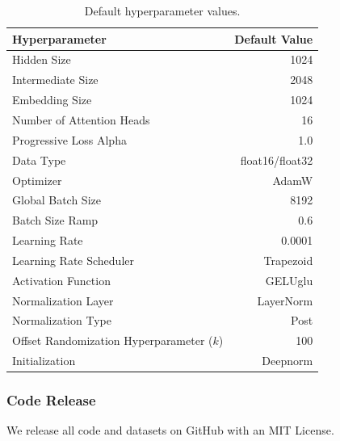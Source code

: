 \documentclass{article}
\begin{document}
\begin{table}
    \centering
    \caption{Default hyperparameter values.}
    \begin{tabular}{lr} 
    \toprule
         Hyperparameter & Default Value\\
         \midrule
         Hidden Size& 1024\\ 
         Intermediate Size& 2048\\ 
         Embedding Size& 1024\\ 
         Number of Attention Heads& 16\\ 
         Progressive Loss Alpha \citep{bansal2022endtoend} & 1.0\\ 
         Data Type & float16/float32\\ 
         Optimizer& AdamW \citep{loshchilov2017decoupled}\\ 
         Global Batch Size& 8192\\ 
         Batch Size Ramp& 0.6\\ 
         Learning Rate&0.0001\\
         Learning Rate Scheduler&Trapezoid \citep{zhai2022scaling}\\
         Activation Function&GELUglu \citep{shazeer2020glu}\\ 
         Normalization Layer&LayerNorm \citep{ba2016layer}\\ 
         Normalization Type&Post\\ 
         Offset Randomization Hyperparameter (\(k\)) & 100 \\
         Initialization & Deepnorm \citep{wang_deepnet_2022}\\
        \bottomrule
    \end{tabular}
    
    \label{tab:hyperparams}
\end{table}

\subsubsection{Code Release}
We release all code and datasets on GitHub with an MIT License. 

\end{document}
